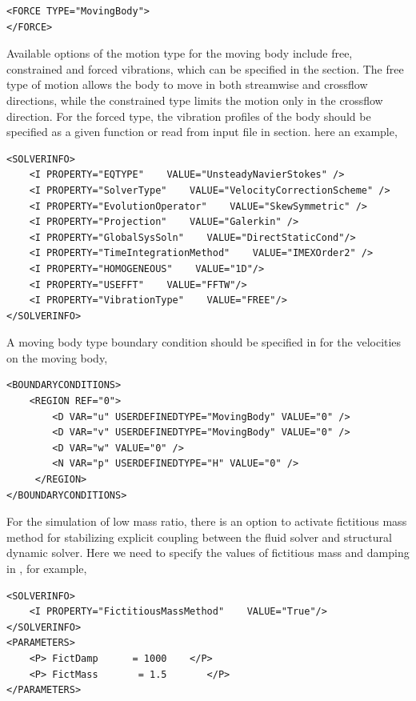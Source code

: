 \begin{lstlisting}[style=XMLStyle]
<FORCE TYPE="MovingBody">
</FORCE>
\end{lstlisting}

Available options of the motion type for the moving body include free, constrained and forced vibrations, which can be specified in the  section. The free type of motion allows the body to move in both streamwise and crossflow directions, while the constrained type limits the motion only in the crossflow direction. For the forced type, the vibration profiles of the body should be specified as a given function or read from input file in  section. here an example,

\begin{lstlisting}[style=XMLStyle]
<SOLVERINFO>
    <I PROPERTY="EQTYPE"    VALUE="UnsteadyNavierStokes" />
    <I PROPERTY="SolverType"    VALUE="VelocityCorrectionScheme" />
    <I PROPERTY="EvolutionOperator"    VALUE="SkewSymmetric" />
    <I PROPERTY="Projection"    VALUE="Galerkin" />
    <I PROPERTY="GlobalSysSoln"    VALUE="DirectStaticCond"/>
    <I PROPERTY="TimeIntegrationMethod"    VALUE="IMEXOrder2" />
    <I PROPERTY="HOMOGENEOUS"    VALUE="1D"/>
    <I PROPERTY="USEFFT"    VALUE="FFTW"/>
    <I PROPERTY="VibrationType"    VALUE="FREE"/>
</SOLVERINFO>
\end{lstlisting}

A moving body type boundary condition should be specified in  for the velocities on the moving body,

\begin{lstlisting}[style=XMLStyle]
<BOUNDARYCONDITIONS>
    <REGION REF="0">
        <D VAR="u" USERDEFINEDTYPE="MovingBody" VALUE="0" />
        <D VAR="v" USERDEFINEDTYPE="MovingBody" VALUE="0" />
        <D VAR="w" VALUE="0" />
        <N VAR="p" USERDEFINEDTYPE="H" VALUE="0" />
     </REGION>
</BOUNDARYCONDITIONS>
\end{lstlisting}

For the simulation of low mass ratio, there is an option to activate fictitious mass method for stabilizing explicit coupling between the fluid solver and structural dynamic solver. Here we need to specify the values of fictitious mass and damping in , for example,

\begin{lstlisting}[style=XMLStyle]
<SOLVERINFO>
    <I PROPERTY="FictitiousMassMethod"    VALUE="True"/>
</SOLVERINFO>
<PARAMETERS>
    <P> FictDamp      = 1000    </P>
    <P> FictMass       = 1.5       </P>
</PARAMETERS>
\end{lstlisting}

